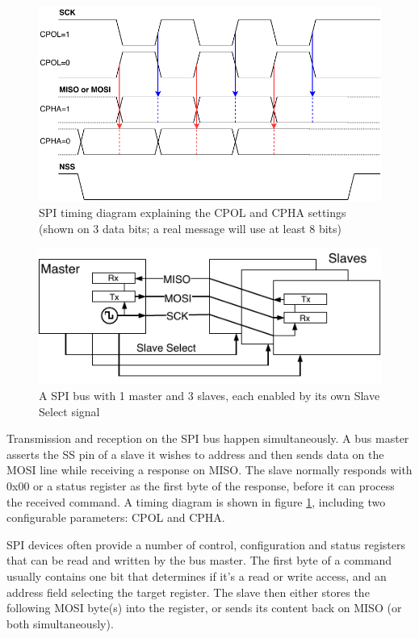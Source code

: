 \begin{figure}[h]
	\centering
	\includegraphics[scale=.9] {img/spi-timing.pdf}
	\caption[SPI timing diagram]{\label{fig:spi-timing}SPI timing diagram explaining the CPOL and CPHA settings (shown on 3 data bits; a real message will use at least 8 bits)}
\end{figure}

\begin{figure}[h]
\centering
\includegraphics[scale=1.1] {img/spi-multislave-redraw.pdf}
\caption[SPI master with multiple slaves]{\label{fig:spi-multislave}A SPI bus with 1 master and 3 slaves, each enabled by its own Slave Select signal}
\end{figure}

Transmission and reception on the \gls{SPI} bus happen simultaneously. A bus master asserts the \gls{SS} pin of a slave it wishes to address and then sends data on the \gls{MOSI} line while receiving a response on \gls{MISO}. The slave normally responds with 0x00 or a status register as the first byte of the response, before it can process the received command. A timing diagram is shown in figure \ref{fig:spi-timing}, including two configurable parameters: \gls{CPOL} and \gls{CPHA}.

\gls{SPI} devices often provide a number of control, configuration and status registers that can be read and written by the bus master. The first byte of a command usually contains one bit that determines if it's a read or write access, and an address field selecting the target register. The slave then either stores the following \gls{MOSI} byte(s) into the register, or sends its content back on \gls{MISO} (or both simultaneously).

